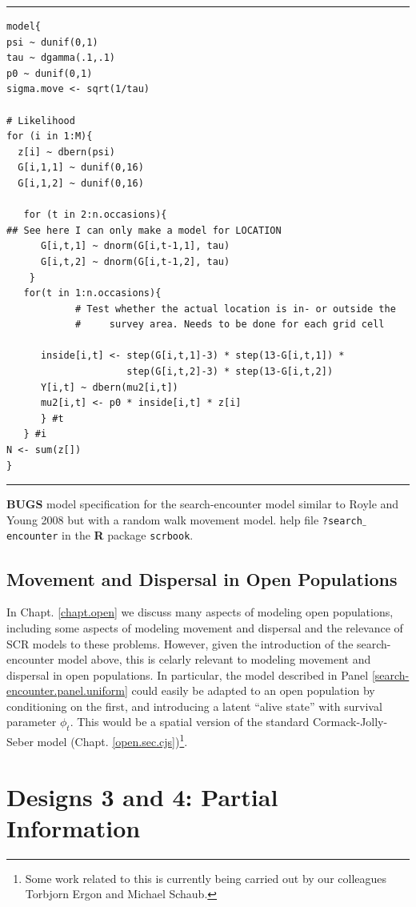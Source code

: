 \begin{panel}[htp]
\centering
\rule[0.15in]{\textwidth}{.03in}
{\small
\begin{verbatim}
model{
psi ~ dunif(0,1)
tau ~ dgamma(.1,.1)
p0 ~ dunif(0,1)
sigma.move <- sqrt(1/tau)

# Likelihood
for (i in 1:M){
  z[i] ~ dbern(psi)
  G[i,1,1] ~ dunif(0,16)
  G[i,1,2] ~ dunif(0,16)

   for (t in 2:n.occasions){
## See here I can only make a model for LOCATION
      G[i,t,1] ~ dnorm(G[i,t-1,1], tau)
      G[i,t,2] ~ dnorm(G[i,t-1,2], tau)
    }
   for(t in 1:n.occasions){
            # Test whether the actual location is in- or outside the 
            #     survey area. Needs to be done for each grid cell

      inside[i,t] <- step(G[i,t,1]-3) * step(13-G[i,t,1]) *
                     step(G[i,t,2]-3) * step(13-G[i,t,2])
      Y[i,t] ~ dbern(mu2[i,t])
      mu2[i,t] <- p0 * inside[i,t] * z[i]
      } #t
   } #i
N <- sum(z[])
}
\end{verbatim}
}
\rule[-0.15in]{\textwidth}{.03in}
\caption{
{\bf BUGS} model specification for the search-encounter model similar
to Royle and Young 2008 but with a random walk movement model.
help file \mbox{\tt ?search$\_$encounter} in the {\bf R} package \mbox{\tt scrbook}.
}
\label{search-encounter.panel.uniform}
\end{panel}

\subsection{Movement and Dispersal in Open Populations}

In Chapt. \ref{chapt.open} we discuss many aspects of modeling open
populations, including some aspects of modeling movement and dispersal
and the relevance of SCR models to these problems. However, given the
introduction of the search-encounter model above, this is celarly
relevant to modeling movement and dispersal in open populations.  In
particular, the model described in Panel
\ref{search-encounter.panel.uniform} could easily be adapted to an
open population by conditioning on the first, and introducing a latent
``alive state'' with survival parameter $\phi_{t}$. This would be a
spatial version of the standard Cormack-Jolly-Seber model
(Chapt. \ref{open.sec.cjs})\footnote{Some work related to this is
  currently being carried out by our colleagues Torbjorn Ergon and
  Michael Schaub.}.

\section{Designs 3 and 4: Partial Information}


